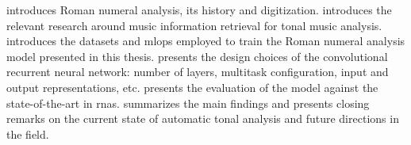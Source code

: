 
introduces Roman numeral analysis, its history and
digitization.  introduces the relevant
research around music information retrieval for tonal music
analysis.  introduces
the datasets and \gls{mlops} employed to train the Roman
numeral analysis model presented in this thesis.
 presents the design choices of the
convolutional recurrent neural network: number of layers,
multitask configuration, input and output representations,
etc.  presents the
evaluation of the model against the state-of-the-art in
\glspl{rna}. 
summarizes the main findings and presents closing remarks on
the current state of automatic tonal analysis and future
directions in the field.
